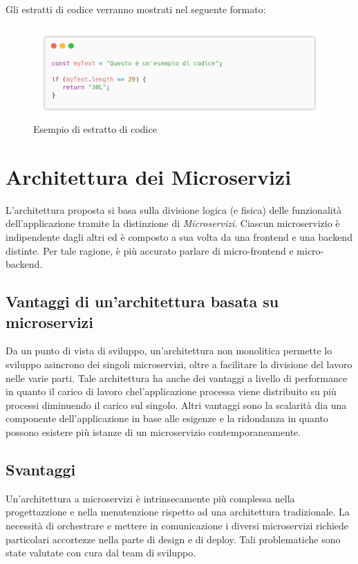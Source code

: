 \documentclass{report}
\begin{document}
Gli estratti di codice verranno mostrati nel seguente formato:
\begin{figure}[H]
	\centering\includegraphics[width=1\textwidth]{images/example_code_01.png}
	Esempio di estratto di codice
\end{figure}

\section{Architettura dei Microservizi}

L'architettura proposta si basa sulla divisione logica (e fisica) delle funzionalità dell'applicazione tramite la distinzione di \textit{Microservizi}. Ciascun microservizio è indipendente dagli altri ed è composto a sua volta da una frontend e una backend distinte. Per tale ragione, è più accurato parlare di micro-frontend e micro-backend.

\subsection*{Vantaggi di un'architettura basata su microservizi}

Da un punto di vista di sviluppo, un'architettura non monolitica permette lo sviluppo asincrono dei singoli microservizi, oltre a facilitare la divisione del lavoro nelle varie parti. Tale architettura ha anche dei vantaggi a livello di performance in quanto il carico di lavoro chel'applicazione processa viene distribuito su più processi diminuendo il carico sul singolo. Altri vantaggi sono la scalarità dia una componente dell'applicazione in base alle esigenze e la ridondanza in quanto possono esistere più istanze di un microservizio contemporaneamente.

\subsection*{Svantaggi}

Un'architettura a microservizi è intrinsecamente più complessa nella progettazzione e nella menutenzione rispetto ad una architettura tradizionale. La necessità di orchestrare e mettere in comunicazione i diversi microservizi richiede particolari accortezze nella parte di design e di deploy. Tali problematiche sono state valutate con cura dal team di sviluppo.
\end{document}
